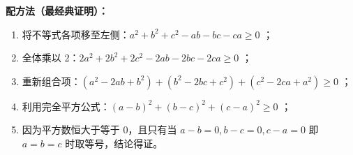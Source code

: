 \begin{proofbox}
\textbf{配方法（最经典证明）：}
\begin{enumerate}
    \item 将不等式各项移至左侧：$a^2 + b^2 + c^2 - ab - bc - ca \geqslant 0$ ；
    \item 全体乘以 2：$2a^2 + 2b^2 + 2c^2 - 2ab - 2bc - 2ca \geqslant 0$ ；
    \item 重新组合项：$(a^2 - 2ab + b^2) + (b^2 - 2bc + c^2) + (c^2 - 2ca + a^2) \geqslant 0$ ；
    \item 利用完全平方公式：$(a-b)^2 + (b-c)^2 + (c-a)^2 \geqslant 0$ ；
    \item 因为平方数恒大于等于 0，且只有当 $a-b=0, b-c=0, c-a=0$ 即 $a=b=c$ 时取等号，结论得证。
\end{enumerate}
\end{proofbox}